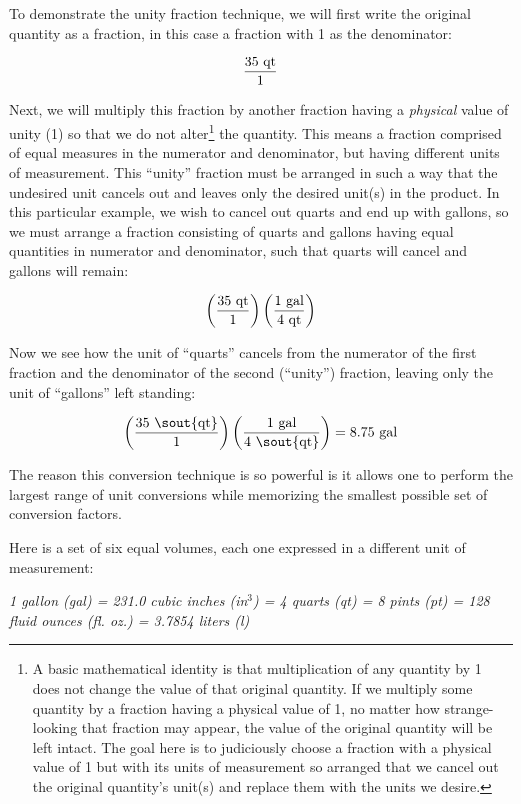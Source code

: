 To demonstrate the unity fraction technique, we will first write the original quantity as a fraction, in this case a fraction with 1 as the denominator:

$${35 \hbox{ qt} \over 1}$$

Next, we will multiply this fraction by another fraction having a \textit{physical} value of unity (1) so that we do not alter\footnote{A basic mathematical identity is that multiplication of any quantity by 1 does not change the value of that original quantity.  If we multiply some quantity by a fraction having a physical value of 1, no matter how strange-looking that fraction may appear, the value of the original quantity will be left intact.  The goal here is to judiciously choose a fraction with a physical value of 1 but with its units of measurement so arranged that we cancel out the original quantity's unit(s) and replace them with the units we desire.} the quantity.  This means a fraction comprised of equal measures in the numerator and denominator, but having different units of measurement.  This ``unity'' fraction must be arranged in such a way that the undesired unit cancels out and leaves only the desired unit(s) in the product.  In this particular example, we wish to cancel out quarts and end up with gallons, so we must arrange a fraction consisting of quarts and gallons having equal quantities in numerator and denominator, such that quarts will cancel and gallons will remain:

$$\left({35 \hbox{ qt} \over 1}\right) \left({1 \hbox{ gal} \over 4 \hbox{ qt}}\right)$$

Now we see how the unit of ``quarts'' cancels from the numerator of the first fraction and the denominator of the second (``unity'') fraction, leaving only the unit of ``gallons'' left standing:

$$\left({35 \hbox{ \sout{qt}} \over 1}\right) \left({1 \hbox{ gal} \over 4 \hbox{ \sout{qt}}}\right) = 8.75 \hbox{ gal}$$

The reason this conversion technique is so powerful is it allows one to perform the largest range of unit conversions while memorizing the smallest possible set of conversion factors.

\vskip 10pt

Here is a set of six equal volumes, each one expressed in a different unit of measurement:

\vskip 10pt

\noindent
\textit{1 gallon (gal) = 231.0 cubic inches (in$^{3}$) = 4 quarts (qt) = 8 pints (pt) = 128 fluid ounces (fl. oz.) = 3.7854 liters (l)}


